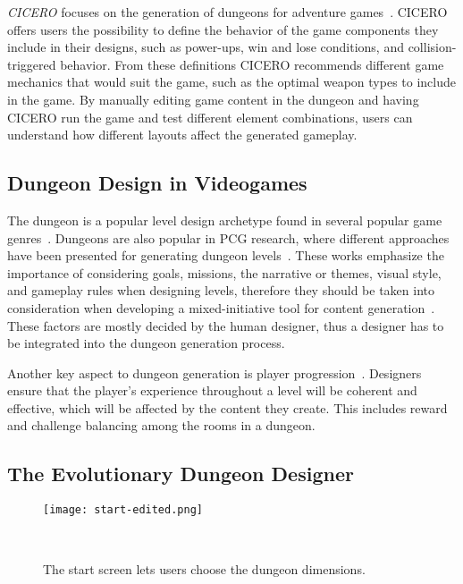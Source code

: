 \documentclass[sigconf]{acmart}
\begin{document}
\emph{CICERO} focuses on the generation of dungeons for adventure games~\cite{MachadoCiceroSeekWhence}. CICERO offers users the possibility to define the behavior of the game components they include in their designs, such as power-ups, win and lose conditions, and collision-triggered behavior. From these definitions CICERO recommends different game mechanics that would suit the game, such as the optimal weapon types to include in the game. By manually editing game content in the dungeon and having CICERO run the game and test different element combinations, users can understand how different layouts affect the generated gameplay. 

\subsection{Dungeon Design in Videogames}
The dungeon is a popular level design archetype found in several popular game genres~\cite{miyamoto_legend_1986,brevik_diablo_1996}. Dungeons are also popular in PCG research, where different approaches have been presented for generating dungeon levels~\cite{shaker_procedural_2016,johnson_cellular_2010,dormans_adventures_2010,van_der_linden_designing_2013,karavolos_evolving_2016}. These works emphasize the importance of considering goals, missions, the narrative or themes, visual style, and gameplay rules when designing levels, therefore they should be taken into consideration when developing a mixed-initiative tool for content generation~\cite{karavolos_mixed-initiative_2015}. These factors are mostly decided by the human designer, thus a designer has to be integrated into the dungeon generation process. 

Another key aspect to dungeon generation is player progression~\cite{butler2013mixed}. Designers ensure that the player’s experience throughout a level will be coherent and effective, which will be affected by the content they create. This includes reward and challenge balancing among the rooms in a dungeon.

\subsection{The Evolutionary Dungeon Designer}

\begin{figure}[t]
    \centering
    \texttt{[image: start-edited.png]}
    \caption{The start screen lets users choose the dungeon dimensions.}~\label{fig:launch}
\end{figure}
\end{document}
